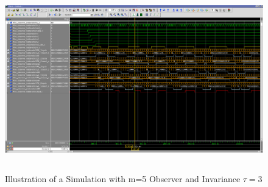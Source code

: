 \begin{figure}[]
\centering
\includegraphics[width=650px,height=300px,angle=-90]{../../pictures/Modelsim/5_Observer_tb_1.png}
\caption[Modelsim Simulation of 5 Observer]{Illustration of a Simulation with m=5 Observer and Invariance $\tau=3$}
\label{fig:simulation:five}
\end{figure}

\newpage
